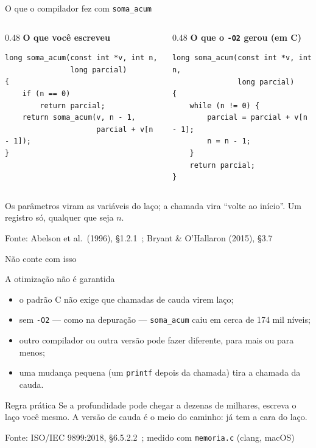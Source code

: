 \documentclass[aspectratio=169]{beamer}
\newcommand{\fonte}[1]{\vfill\hfill{\scriptsize\textcolor{UFSGray}{Fonte: #1}}}
\begin{document}
\begin{frame}[fragile]{O que o compilador fez com \texttt{soma\_acum}}
  \begin{columns}[T]
    \begin{column}{0.48\textwidth}
      \textcolor{UFSBlue}{\textbf{O que você escreveu}}
\begin{lstlisting}[style=tinyC]
long soma_acum(const int *v, int n,
               long parcial)
{
    if (n == 0)
        return parcial;
    return soma_acum(v, n - 1,
                     parcial + v[n - 1]);
}
\end{lstlisting}
    \end{column}
    \begin{column}{0.48\textwidth}
      \textcolor{UFSBlue}{\textbf{O que o \texttt{-O2} gerou (em C)}}
\begin{lstlisting}[style=tinyC]
long soma_acum(const int *v, int n,
               long parcial)
{
    while (n != 0) {
        parcial = parcial + v[n - 1];
        n = n - 1;
    }
    return parcial;
}
\end{lstlisting}
    \end{column}
  \end{columns}
  \begin{block}{}
    \small Os parâmetros viram as variáveis do laço; a chamada vira
    ``volte ao início''. Um registro só, qualquer que seja $n$.
  \end{block}
  \fonte{Abelson et al.\ (1996), §1.2.1~\cite{abelson1996structure};
    Bryant \& O'Hallaron (2015), §3.7~\cite{bryant2015computer}}
\end{frame}

\begin{frame}{Não conte com isso}
  \begin{alertblock}{A otimização não é garantida}
    \small
    \begin{itemize}
      \item o padrão C não exige que chamadas de cauda virem laço;
      \item sem \texttt{-O2} --- como na depuração --- \texttt{soma\_acum}
        caiu em cerca de 174 mil níveis;
      \item outro compilador ou outra versão pode fazer diferente, para mais
        ou para menos;
      \item uma mudança pequena (um \texttt{printf} depois da chamada) tira a
        chamada da cauda.
    \end{itemize}
  \end{alertblock}
  \begin{block}{Regra prática}
    \small Se a profundidade pode chegar a dezenas de milhares, escreva o
    laço você mesmo. A versão de cauda é o meio do caminho: já tem a cara
    do laço.
  \end{block}
  \fonte{ISO/IEC 9899:2018, §6.5.2.2~\cite{iso2018c17}; medido com
    \texttt{memoria.c} (clang, macOS)}
\end{frame}
\end{document}
